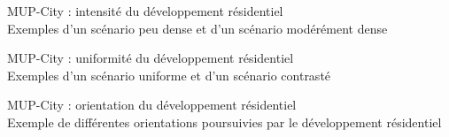 \documentclass[xcolor=table]{beamer}
\begin{document}
\begin{frame}{MUP-City : intensité du développement résidentiel}
\vspace{1cm}
\\
{\footnotesize Exemples d'un scénario peu dense et d'un scénario modérément dense} %
\end{frame}


\begin{frame}{MUP-City : uniformité du développement résidentiel}
\vspace{1cm}
\\
{\footnotesize Exemples d'un scénario uniforme et d'un scénario contrasté}%
\end{frame}


\begin{frame}{MUP-City : orientation du développement résidentiel}
\vspace{1cm}
\\
{\footnotesize Exemple de différentes orientations poursuivies par le développement résidentiel}%
\end{frame}
\end{document}
